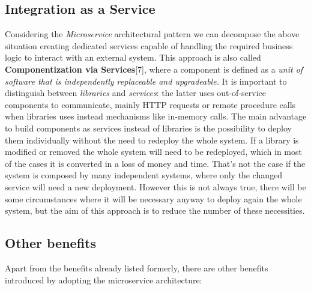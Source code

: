 \begin{itemize}
\subsection{Integration as a Service}
Considering the \textit{Microservice} architectural pattern we can decompose
the above situation creating dedicated services capable of handling the
required business logic to interact with an external system. This approach
is also called \textbf{Componentization via Services}[7], where a component is defined
as a \textit{unit of software that is independently replaceable and upgradeable.}
It is important to distinguish between \textit{libraries} and \textit{services}:
the latter uses out-of-service components to communicate, mainly HTTP requests or
remote procedure calls when libraries uses instead mechanisms like in-memory calls.
The main advantage to build components as services instead of libraries is the
possibility to deploy them individually without the need to redeploy the whole system.
If a library is modified or removed the whole system will need to be redeployed,
which in most of the cases it is converted in a loss of money and time. That's not
the case if the system is composed by many independent systems, where only the changed
service will need a new deployment. However this is not always true, there will be some
circumstances where it will be necessary anyway to deploy again the whole system, but the
aim of this approach is to reduce the number of these necessities.

\subsection{Other benefits}
Apart from the benefits already listed formerly, there are other benefits introduced by
adopting the microservice architecture:


\end{itemize}
